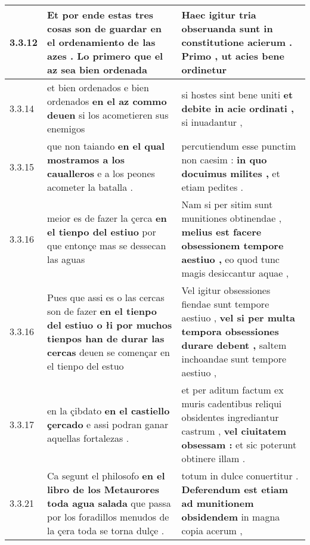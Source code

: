 \begin{tabular}{|p{1cm}|p{6.5cm}|p{6.5cm}|}
3.3.12 & Et por ende estas tres cosas son de guardar \textbf{ en el ordenamiento de las azes . } Lo primero que el az sea bien ordenada & Haec igitur tria obseruanda sunt \textbf{ in constitutione acierum . } Primo , ut acies bene ordinetur \\\hline
3.3.14 & et bien ordenados e bien ordenados \textbf{ en el az commo deuen } si los acometieren sus enemigos & si hostes sint bene uniti \textbf{ et debite in acie ordinati , } si inuadantur , \\\hline
3.3.15 & que non taiando \textbf{ en el qual mostramos a los caualleros } e a los peones acometer la batalla . & percutiendum esse punctim non caesim : \textbf{ in quo docuimus milites , } et etiam pedites . \\\hline
3.3.16 & meior es de fazer la çerca \textbf{ en el tienpo del estiuo } por que entonçe mas se dessecan las aguas & Nam si per sitim sunt munitiones obtinendae , \textbf{ melius est facere obsessionem tempore aestiuo , } eo quod tunc magis desiccantur aquae , \\\hline
3.3.16 & Pues que assi es o las cercas son de fazer \textbf{ en el tienpo del estiuo o łi por muchos tienpos han de durar las cercas } deuen se començar en el tienpo del estuo & Vel igitur obsessiones fiendae sunt tempore aestiuo , \textbf{ vel si per multa tempora obsessiones durare debent , } saltem inchoandae sunt tempore aestiuo , \\\hline
3.3.17 & en la çibdato \textbf{ en el castiello çercado } e assi podran ganar aquellas fortalezas . & et per aditum factum ex muris cadentibus reliqui obsidentes ingrediantur castrum , \textbf{ vel ciuitatem obsessam : } et sic poterunt obtinere illam . \\\hline
3.3.21 & Ca segunt el philosofo \textbf{ en el libro de los 
                     Metaurores 
                   toda agua salada } que passa por los foradillos menudos de la çera toda se torna dulçe . & totum in dulce conuertitur . \textbf{ Deferendum est etiam ad munitionem obsidendem } in magna copia acerum , \\\hline

\end{tabular}
